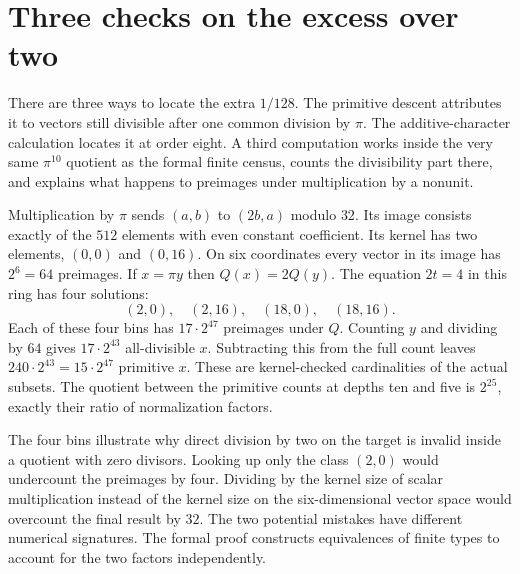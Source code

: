 \documentclass[12pt,letterpaper]{article}
\begin{document}
\section{Three checks on the excess over two}
There are three ways to locate the extra $1/128$. The primitive descent attributes it to vectors still divisible after one common division by $\pi$. The additive-character calculation locates it at order eight. A third computation works inside the very same $\pi^{10}$ quotient as the formal finite census, counts the divisibility part there, and explains what happens to preimages under multiplication by a nonunit.
\par
Multiplication by $\pi$ sends $(a,b)$ to $(2b,a)$ modulo $32$. Its image consists exactly of the $512$ elements with even constant coefficient. Its kernel has two elements, $(0,0)$ and $(0,16)$. On six coordinates every vector in its image has $2^6=64$ preimages. If $x=\pi y$ then $Q(x)=2Q(y)$. The equation $2t=4$ in this ring has four solutions:
\[
             (2,0),\quad(2,16),\quad(18,0),\quad(18,16).
\]
Each of these four bins has $17\cdot2^{47}$ preimages under $Q$. Counting $y$ and dividing by $64$ gives $17\cdot2^{43}$ all-divisible $x$. Subtracting this from the full count leaves $240\cdot2^{43}=15\cdot2^{47}$ primitive $x$. These are kernel-checked cardinalities of the actual subsets. The quotient between the primitive counts at depths ten and five is $2^{25}$, exactly their ratio of normalization factors.
\par
The four bins illustrate why direct division by two on the target is invalid inside a quotient with zero divisors. Looking up only the class $(2,0)$ would undercount the preimages by four. Dividing by the kernel size of scalar multiplication instead of the kernel size on the six-dimensional vector space would overcount the final result by $32$. The two potential mistakes have different numerical signatures. The formal proof constructs equivalences of finite types to account for the two factors independently.
\end{document}

